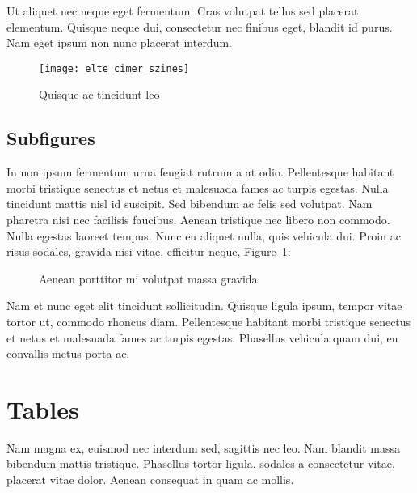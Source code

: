 Ut aliquet nec neque eget fermentum. Cras volutpat tellus sed placerat elementum. Quisque neque dui, consectetur nec finibus eget, blandit id purus. Nam eget ipsum non nunc placerat interdum.

\begin{figure}[H]
	\centering
	\texttt{[image: elte\_cimer\_szines]}
	\caption{Quisque ac tincidunt leo}
\end{figure}

\subsection{Subfigures}

In non ipsum fermentum urna feugiat rutrum a at odio. Pellentesque habitant morbi tristique senectus et netus et malesuada fames ac turpis egestas. Nulla tincidunt mattis nisl id suscipit. Sed bibendum ac felis sed volutpat. Nam pharetra nisi nec facilisis faucibus. Aenean tristique nec libero non commodo. Nulla egestas laoreet tempus. Nunc eu aliquet nulla, quis vehicula dui. Proin ac risus sodales, gravida nisi vitae, efficitur neque, Figure~\ref{fig:example-2}:

\begin{figure}[H]
	\centering
	\hspace{5pt}
	\caption{Aenean porttitor mi volutpat massa gravida}
	\label{fig:example-2}
\end{figure}

Nam et nunc eget elit tincidunt sollicitudin. Quisque ligula ipsum, tempor vitae tortor ut, commodo rhoncus diam. Pellentesque habitant morbi tristique senectus et netus et malesuada fames ac turpis egestas. Phasellus vehicula quam dui, eu convallis metus porta ac.


\section{Tables}

Nam magna ex, euismod nec interdum sed, sagittis nec leo. Nam blandit massa bibendum mattis tristique. Phasellus tortor ligula, sodales a consectetur vitae, placerat vitae dolor. Aenean consequat in quam ac mollis. 

